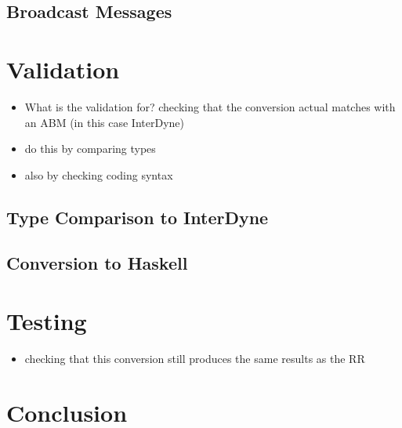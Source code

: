 \documentclass{article}
\begin{document}
\subsection{Broadcast Messages}


\section{Validation}

\begin{itemize}
  \item What is the validation for? checking that the conversion actual matches with an ABM (in this case InterDyne)
  \item do this by comparing types 
  \item also by checking coding syntax 
\end{itemize}


\subsection{Type Comparison to InterDyne}


\subsection{Conversion to Haskell}


\section{Testing}

\begin{itemize}
  \item checking that this conversion still produces the same results as the RR 
\end{itemize}


\section{Conclusion}
\end{document}
